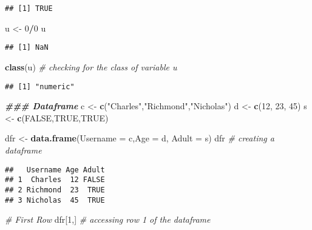 \documentclass[
]{article}
\newenvironment{Shaded}{\begin{snugshade}}{\end{snugshade}}
\newcommand{\AttributeTok}[1]{\textcolor[rgb]{0.13,0.29,0.53}{#1}}
\newcommand{\CommentTok}[1]{\textcolor[rgb]{0.56,0.35,0.01}{\textit{#1}}}
\newcommand{\ConstantTok}[1]{\textcolor[rgb]{0.56,0.35,0.01}{#1}}
\newcommand{\DecValTok}[1]{\textcolor[rgb]{0.00,0.00,0.81}{#1}}
\newcommand{\DocumentationTok}[1]{\textcolor[rgb]{0.56,0.35,0.01}{\textbf{\textit{#1}}}}
\newcommand{\FunctionTok}[1]{\textcolor[rgb]{0.13,0.29,0.53}{\textbf{#1}}}
\newcommand{\NormalTok}[1]{#1}
\newcommand{\OtherTok}[1]{\textcolor[rgb]{0.56,0.35,0.01}{#1}}
\newcommand{\SpecialCharTok}[1]{\textcolor[rgb]{0.81,0.36,0.00}{\textbf{#1}}}
\newcommand{\StringTok}[1]{\textcolor[rgb]{0.31,0.60,0.02}{#1}}
\begin{document}
\begin{verbatim}
## [1] TRUE
\end{verbatim}

\begin{Shaded}
\begin{Highlighting}[]
\NormalTok{u }\OtherTok{\textless{}{-}} \DecValTok{0}\SpecialCharTok{/}\DecValTok{0}
\NormalTok{u}
\end{Highlighting}
\end{Shaded}

\begin{verbatim}
## [1] NaN
\end{verbatim}

\begin{Shaded}
\begin{Highlighting}[]
\FunctionTok{class}\NormalTok{(u) }\CommentTok{\# checking for the class of variable u}
\end{Highlighting}
\end{Shaded}

\begin{verbatim}
## [1] "numeric"
\end{verbatim}

\begin{Shaded}
\begin{Highlighting}[]
\DocumentationTok{\#\#\# Dataframe}
\NormalTok{c }\OtherTok{\textless{}{-}} \FunctionTok{c}\NormalTok{(}\StringTok{"Charles"}\NormalTok{,}\StringTok{"Richmond"}\NormalTok{,}\StringTok{"Nicholas"}\NormalTok{)}
\NormalTok{d }\OtherTok{\textless{}{-}} \FunctionTok{c}\NormalTok{(}\DecValTok{12}\NormalTok{, }\DecValTok{23}\NormalTok{, }\DecValTok{45}\NormalTok{)}
\NormalTok{s }\OtherTok{\textless{}{-}} \FunctionTok{c}\NormalTok{(}\ConstantTok{FALSE}\NormalTok{,}\ConstantTok{TRUE}\NormalTok{,}\ConstantTok{TRUE}\NormalTok{)}

\NormalTok{dfr }\OtherTok{\textless{}{-}} \FunctionTok{data.frame}\NormalTok{(}\AttributeTok{Username =}\NormalTok{ c,}\AttributeTok{Age =}\NormalTok{ d, }\AttributeTok{Adult =}\NormalTok{ s)}
\NormalTok{dfr }\CommentTok{\# creating a dataframe}
\end{Highlighting}
\end{Shaded}

\begin{verbatim}
##   Username Age Adult
## 1  Charles  12 FALSE
## 2 Richmond  23  TRUE
## 3 Nicholas  45  TRUE
\end{verbatim}

\begin{Shaded}
\begin{Highlighting}[]
\CommentTok{\# First Row}
\NormalTok{dfr[}\DecValTok{1}\NormalTok{,] }\CommentTok{\# accessing row 1 of the dataframe}
\end{Highlighting}
\end{Shaded}
\end{document}
